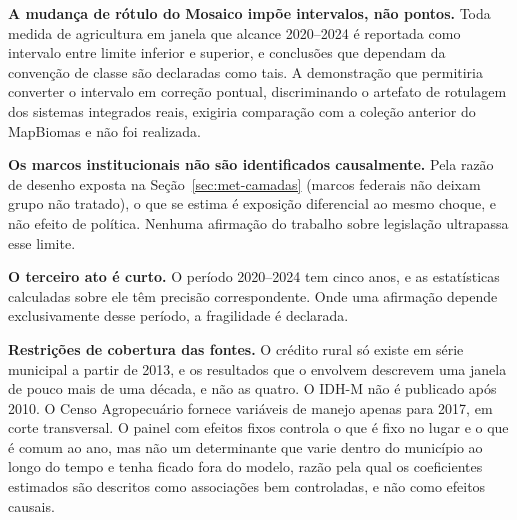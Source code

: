 \textbf{A mudança de rótulo do Mosaico impõe intervalos, não pontos.} Toda
medida de agricultura em janela que alcance 2020--2024 é reportada como
intervalo entre limite inferior e superior, e conclusões que dependam da
convenção de classe são declaradas como tais. A demonstração que permitiria
converter o intervalo em correção pontual, discriminando o artefato de
rotulagem dos sistemas integrados reais, exigiria comparação com a coleção
anterior do MapBiomas e não foi realizada.

\textbf{Os marcos institucionais não são identificados causalmente.} Pela
razão de desenho exposta na Seção~\ref{sec:met-camadas} (marcos federais
não deixam grupo não tratado), o que se estima é exposição diferencial ao
mesmo choque, e não efeito de política. Nenhuma afirmação do trabalho sobre
legislação ultrapassa esse limite.

\textbf{O terceiro ato é curto.} O período 2020--2024 tem cinco anos, e as
estatísticas calculadas sobre ele têm precisão correspondente. Onde uma
afirmação depende exclusivamente desse período, a fragilidade é declarada.

\textbf{Restrições de cobertura das fontes.} O crédito rural só existe em
série municipal a partir de 2013, e os resultados que o envolvem descrevem uma
janela de pouco mais de uma década, e não as quatro. O IDH-M não é publicado
após 2010. O Censo Agropecuário fornece variáveis de manejo apenas para 2017,
em corte transversal. O painel com efeitos fixos controla o que é fixo no
lugar e o que é comum ao ano, mas não um determinante que varie dentro do
município ao longo do tempo e tenha ficado fora do modelo, razão pela qual os
coeficientes estimados são descritos como associações bem controladas, e não
como efeitos causais.
